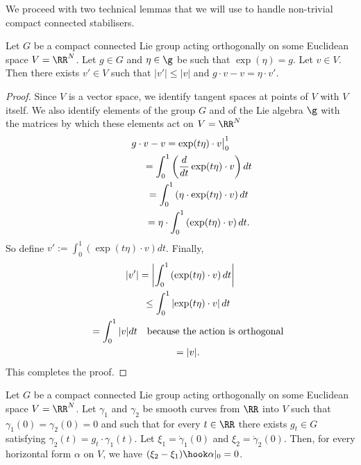
We proceed with two technical lemmas that we will use
to handle non-trivial compact connected stabilisers.

\begin{Lemma}\label{l:techn1}
Let $G$ be a compact connected Lie group acting orthogonally
on some Euclidean space $V = \RR^N$.
Let $g \in G$ and $\eta \in \g$ be such that $\exp(\eta) = g$.
Let $v \in V$. Then there exists $v' \in V$
such that $|v'| \leq |v|$ and $g \cdot v - v = \eta \cdot v'$.
\end{Lemma}

\begin{proof}
Since $V$ is a vector space, we identify tangent spaces at points of $V$
with $V$ itself.
We also identify elements of the group $G$ and of the Lie algebra $\g$
with the matrices by which these elements act on $V=\RR^N$
\begin{gather*}
 g \cdot v - v = \exp(t\eta) \cdot v \big|_0^1\\
\hphantom{g \cdot v - v}{}
 = \int_0^1 \left( \frac{d}{dt} \exp(t\eta) \cdot v\right) dt\\
\hphantom{g \cdot v - v}{}
 = \int_0^1 \left( \eta \cdot \exp(t\eta) \cdot v\right) dt \\
 \hphantom{g \cdot v - v}{}
 = \eta \cdot \int_0^1 \left( \exp(t\eta) \cdot v \right) dt.
\end{gather*}
So def\/ine $v':=\int_0^1\left(\exp(t\eta)\cdot v\right)dt$. Finally,
\begin{gather*}
 |v'| = \left| \int_0^1 \left( \exp(t\eta) \cdot v \right) dt \right|\\
\hphantom{|v'|}{}
 \leq \int_0^1 \left| \exp(t\eta) \cdot v\right| dt\\
 \hphantom{|v'|}{}
 = \int_0^1 |v| dt \quad \text{because the action is orthogonal} \\
\hphantom{|v'|}{} = |v|.
\end{gather*}
This completes the proof.
\end{proof}

\begin{Lemma}\label{l:techn2}
Let $G$ be a compact connected Lie group acting orthogonally
on some Euclidean space $V = \RR^N$.
Let $\gamma_1$ and $\gamma_2$ be smooth curves from $\RR$ into $V$
such that $ \gamma_1(0) = \gamma_2(0) = 0 $
and such that for every $t \in \RR$ there exists $g_t \in G$
satisfying $\gamma_2(t) = g_t \cdot \gamma_1(t)$.
Let $\xi_1 = \dot{\gamma}_1(0)$ and $\xi_2 = \dot{\gamma}_2(0)$.
Then, for every horizontal form $\alpha$ on $V$,
we have $(\xi_2-\xi_1)\hook\alpha|_0=0$.
\end{Lemma}

